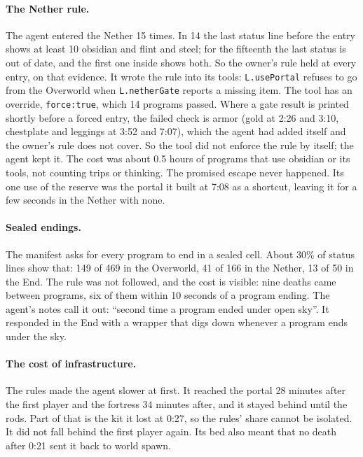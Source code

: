 \documentclass[11pt,a4paper]{article}
\begin{document}
\paragraph{The Nether rule.} The agent entered the Nether 15 times. In 14 the last status line before the entry shows at least 10 obsidian and flint and steel; for the fifteenth the last status is out of date, and the first one inside shows both. So the owner's rule held at every entry, on that evidence. It wrote the rule into its tools: \texttt{L.usePortal} refuses to go from the Overworld when \texttt{L.netherGate} reports a missing item. The tool has an override, \texttt{force:true}, which 14 programs passed. Where a gate result is printed shortly before a forced entry, the failed check is armor (gold at 2:26 and 3:10, chestplate and leggings at 3:52 and 7:07), which the agent had added itself and the owner's rule does not cover. So the tool did not enforce the rule by itself; the agent kept it. The cost was about 0.5 hours of programs that use obsidian or its tools, not counting trips or thinking. The promised escape never happened. Its one use of the reserve was the portal it built at 7:08 as a shortcut, leaving it for a few seconds in the Nether with none.

\paragraph{Sealed endings.} The manifest asks for every program to end in a sealed cell. About 30\% of status lines show that: 149 of 469 in the Overworld, 41 of 166 in the Nether, 13 of 50 in the End. The rule was not followed, and the cost is visible: nine deaths came between programs, six of them within 10 seconds of a program ending. The agent's notes call it out: ``second time a program ended under open sky''. It responded in the End with a wrapper that digs down whenever a program ends under the sky.

\paragraph{The cost of infrastructure.} The rules made the agent slower at first. It reached the portal 28 minutes after the first player and the fortress 34 minutes after, and it stayed behind until the rods. Part of that is the kit it lost at 0:27, so the rules' share cannot be isolated. It did not fall behind the first player again. Its bed also meant that no death after 0:21 sent it back to world spawn.
\end{document}
